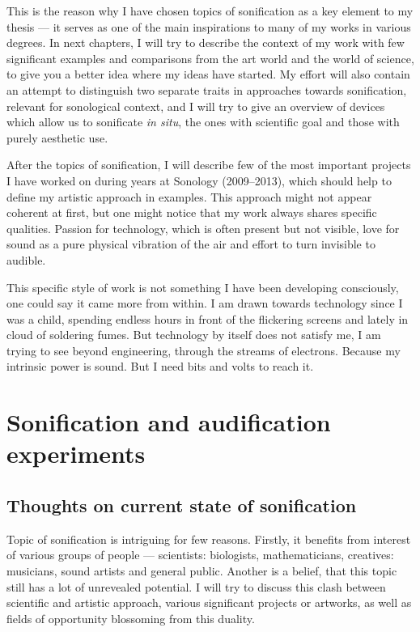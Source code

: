 \documentclass[12pt,a4paper,oneside]{report}
\begin{document}
This is the reason why I have chosen topics of sonification as a key element to my thesis --- it serves as one of the main inspirations to many of my works in various degrees. In next chapters, I will try to describe the context of my work with few significant examples and comparisons from the art world and the world of science, to give you a better idea where my ideas have started. My effort will also contain an attempt to distinguish two separate traits in approaches towards sonification, relevant for sonological context, and I will try to give an overview of devices which allow us to sonificate \textit{in situ}, the ones with scientific goal and those with purely aesthetic use.

After the topics of sonification, I will describe few of the most important projects I have worked on during years at Sonology (2009--2013), which should help to define my artistic approach in examples. This approach might not appear coherent at first, but one might notice that my work always shares specific qualities. Passion for technology, which is often present but not visible, love for sound as a pure physical vibration of the air and effort to turn invisible to audible.

This specific style of work is not something I have been developing consciously, one could say it came more from within. I am drawn towards technology since I was a child, spending endless hours in front of the flickering screens and lately in cloud of soldering fumes. But technology by itself does not satisfy me, I am trying to see beyond engineering, through the streams of electrons. Because my intrinsic power is sound. But I need bits and volts to reach it.

\chapter{Sonification and audification experiments}

\section{Thoughts on current state of sonification}


Topic of sonification is intriguing for few reasons. Firstly, it benefits from interest of various groups of people --- scientists: biologists, mathematicians, creatives: musicians, sound artists and general public. Another is a belief, that this topic still has a lot of unrevealed potential. I will try to discuss this clash between scientific and artistic approach, various significant projects or artworks, as well as fields of opportunity blossoming from this duality.
\end{document}
